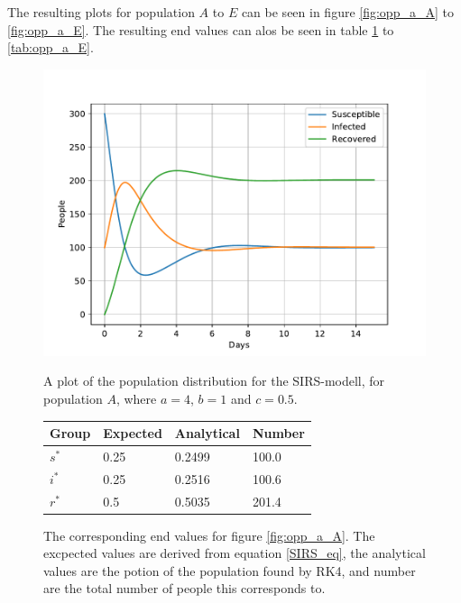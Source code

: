 \documentclass[a4paper]{article}
\begin{document}
The resulting plots for population $A$ to $E$ can be seen in figure \ref{fig:opp_a_A} to \ref{fig:opp_a_E}. The resulting end values can alos be seen in table \ref{tab:opp_a_A} to \ref{tab:opp_a_E}.

\begin{figure}
	\centering
	\begin{minipage}{0.49\textwidth}
		\centering
		\includegraphics[scale=0.6]{../plots/opp_a_A.pdf}
		\caption{A plot of the population distribution for the SIRS-modell, for population $A$, where $a=4$, $b=1$ and $c=0.5$. }\label{fig:opp_a_A}
	\end{minipage}
	\begin{minipage}{0.49\textwidth}
		\centering
		\captionsetup{type=table} %
		\begin{tabular}{|l|l|l|l|}
			\hline
			Group & Expected & Analytical   & Number  \\ \hline
			$s^*$ & 0.25 & 0.2499 & 100.0 \\ \hline
			$i^*$ & 0.25 & 0.2516 & 100.6 \\ \hline
			$r^*$ & 0.5  & 0.5035 & 201.4 \\ \hline
		\end{tabular}
		\caption{The corresponding end values for figure \ref{fig:opp_a_A}. The excpected values are derived from equation \ref{SIRS_eq}, the analytical values are the potion of the population found by RK4, and number are the total number  of people this corresponds to.}\label{tab:opp_a_A}
	\end{minipage}
\end{figure}
\end{document}

